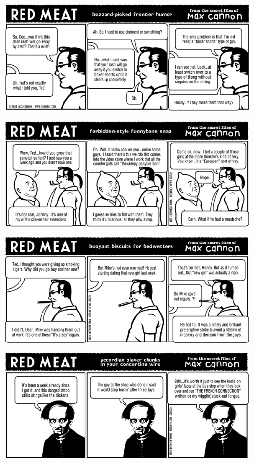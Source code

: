 \documentclass[a4paper,twoside,11pt]{article}
\begin{document}
\includegraphics[width=\textwidth]{redmeat_2003-11-25.png}



\includegraphics[width=\textwidth]{redmeat_2003-12-02.png}



\includegraphics[width=\textwidth]{redmeat_2003-12-09.png}



\includegraphics[width=\textwidth]{redmeat_2003-12-16.png}
\end{document}
